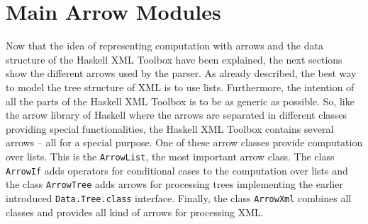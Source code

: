 \documentclass[11pt,a4paper,headsepline, bibtotoc]{scrreprt}
\begin{document}
\section{Main Arrow Modules}\label{mainarrows}
Now that the idea of representing computation with arrows and the data structure of the Haskell XML Toolbox have been explained, the next sections show the different arrows used by the parser. As already described, the best way to model the tree structure of XML is to use lists. Furthermore, the intention of all the parts of the Haskell XML Toolbox is to be as generic as possible. So, like the arrow library of Haskell where the arrows are separated in different classes providing special functionalities, the Haskell XML Toolbox contains several arrows -- all for a special purpose. One of these arrow classes provide computation over lists. This is the \texttt{ArrowList}, the most important arrow class. The class \texttt{ArrowIf} adds operators for conditional cases to the computation over lists and the class \texttt{ArrowTree} adds arrows for processing trees implementing the earlier introduced \texttt{Data.Tree.class} interface. Finally, the class \texttt{ArrowXml} combines all classes and provides all kind of arrows for processing XML.
\end{document}
